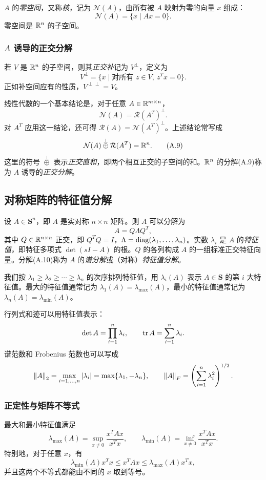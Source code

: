 $A$ 的\emph{零空间}，又称\emph{核}，记为 $\mathcal N(A)$，由所有被 $A$ 映射为零的向量 $x$ 组成：
\[
 \mathcal N(A)=\{x\mid Ax=0\}.
\]
零空间是 $\mathbb R^n$ 的子空间。

\subsubsection*{$A$ 诱导的正交分解}
若 $V$ 是 $\mathbb R^n$ 的子空间，则其\emph{正交补}记为 $V^\perp$，定义为
\[
 V^\perp=\{x\mid\text{对所有 }z\in V,\ z^Tx=0\}.
\]
正如补空间应有的性质，$V^{\perp\perp}=V$。

线性代数的一个基本结论是，对于任意 $A\in\mathbb R^{m\times n}$，
\[
 \mathcal N(A)=\mathcal R(A^T)^\perp.
\]
对 $A^T$ 应用这一结论，还可得 $\mathcal R(A)=\mathcal N(A^T)^\perp$。上述结论常写成
\begin{equation}
 \mathcal N(A)\mathbin{\overset{\perp}{\oplus}}\mathcal R(A^T)=\mathbb R^n.\tag{A.9}
\end{equation}
这里的符号 $\mathbin{\overset{\perp}{\oplus}}$ 表示\emph{正交直和}，即两个相互正交的子空间的和。$\mathbb R^n$ 的分解(A.9)称为 $A$ 诱导的\emph{正交分解}。

\subsection{对称矩阵的特征值分解}
设 $A\in\mathbf S^n$，即 $A$ 是实对称 $n\times n$ 矩阵。则 $A$ 可以分解为
\begin{equation}
 A=Q\Lambda Q^T,\tag{A.10}
\end{equation}
其中 $Q\in\mathbb R^{n\times n}$ 正交，即 $Q^TQ=I$，$\Lambda=\operatorname{diag}(\lambda_1,\ldots,\lambda_n)$。实数 $\lambda_i$ 是 $A$ 的\emph{特征值}，即特征多项式 $\det(sI-A)$ 的根。$Q$ 的各列构成 $A$ 的一组标准正交特征向量。分解(A.10)称为 $A$ 的\emph{谱分解}或（对称）\emph{特征值分解}。

我们按 $\lambda_1\geq\lambda_2\geq\cdots\geq\lambda_n$ 的次序排列特征值，用 $\lambda_i(A)$ 表示 $A\in\mathbf S$ 的第 $i$ 大特征值。最大的特征值通常记为 $\lambda_1(A)=\lambda_{\max}(A)$，最小的特征值通常记为 $\lambda_n(A)=\lambda_{\min}(A)$。

行列式和迹可以用特征值表示：
\[
 \det A=\prod_{i=1}^n\lambda_i,\qquad\operatorname{tr} A=\sum_{i=1}^n\lambda_i.
\]
谱范数和 Frobenius 范数也可以写成
\[
 \left\lVert A\right\rVert_2=\max_{i=1,\ldots,n}\left\lvert \lambda_i\right\rvert=\max\{\lambda_1,-\lambda_n\},\qquad
 \left\lVert A\right\rVert_F=\left(\sum_{i=1}^n\lambda_i^2\right)^{1/2}.
\]

\subsubsection*{正定性与矩阵不等式}
最大和最小特征值满足
\[
 \lambda_{\max}(A)=\sup_{x\neq0}\frac{x^TAx}{x^Tx},\qquad
 \lambda_{\min}(A)=\inf_{x\neq0}\frac{x^TAx}{x^Tx}.
\]
特别地，对于任意 $x$，有
\[
 \lambda_{\min}(A)x^Tx\leq x^TAx\leq\lambda_{\max}(A)x^Tx,
\]
并且这两个不等式都能由不同的 $x$ 取到等号。

